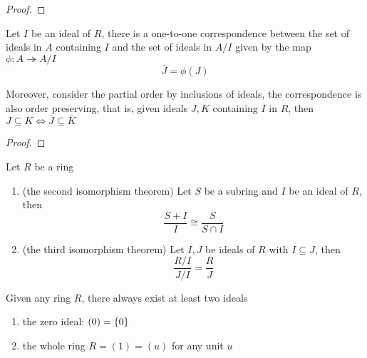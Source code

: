\begin{proof}
\end{proof}

\begin{theorem}
	Let $I$ be an ideal of $R$, there is a one-to-one correspondence between the set of ideals in $A$ containing $I$ and the set of ideals in $A / I$ given by the map $\phi: A \twoheadrightarrow A / I$
	$$
		\bar{J} = \phi(J)
	$$
	
	Moreover, consider the partial order by inclusions of ideals, the correspondence is also order preserving, that is, given ideals $J, K$ containing $I$ in $R$, then $J \subseteq K \iff \bar{J} \subseteq \bar{K}$
	\begin{center}
	\end{center}
\end{theorem}

\begin{proof}
\end{proof}

\begin{remark}
	Let $R$ be a ring
	\begin{enumerate}
		\item (the second isomorphism theorem) Let $S$ be a subring and $I$ be an ideal of $R$, then
		$$
			\frac{S + I}{I} \cong \frac{S}{S \cap I}
		$$
	
		\item (the third isomorphism theorem) Let $I, J$ be ideals of $R$ with $I \subseteq J$, then
		$$
			\frac{R/I}{J/I} = \frac{R}{J}
		$$
	\end{enumerate}
\end{remark}

\begin{remark}
	Given any ring $R$, there always exist at least two ideals
	\begin{enumerate}
		\item the zero ideal: $(0) = \{0\}$
		\item the whole ring $R = (1) = (u)$ for any unit $u$
	\end{enumerate}
\end{remark}

